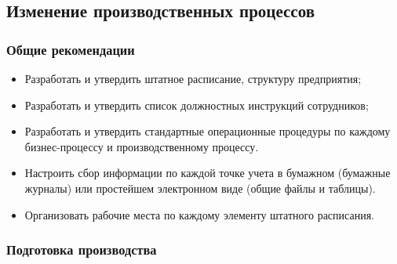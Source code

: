 




\subsection{Изменение производственных процессов}

\subsubsection{Общие рекомендации}

\begin{itemize}
    \item Разработать и утвердить штатное расписание, структуру предприятия;
    \item Разработать и утвердить список должностных инструкций сотрудников;
    \item Разработать и утвердить стандартные операционные процедуры по каждому бизнес-процессу и производственному процессу.
    \item Настроить сбор информации по каждой точке учета в бумажном (бумажные журналы) или простейшем электронном виде (общие файлы и таблицы).
    \item Организовать рабочие места по каждому элементу штатного расписания.
\end{itemize}

\subsubsection{Подготовка производства}

